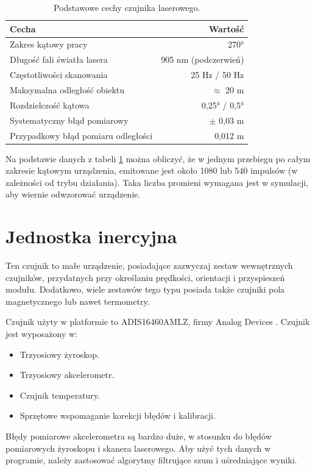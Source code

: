 		\begin{table}
			\centering
			\begin{tabular}{l r}
			Cecha & Wartość \\
			\hline
			Zakres kątowy pracy & \ang{270} \\
			Długość fali światła lasera & 905 \si{\nano\metre} (podczerwień) \\
			Częstotliwości skanowania & 25 \si{\hertz} / 50 \si{\hertz} \\
			Maksymalna odległość obiektu & $\approx$ 20 \si{\metre} \\
			Rozdzielczość kątowa & 0,25° / 0,5° \\
			Systematyczny błąd pomiarowy & $\pm$ 0,03 \si{\metre} \\
			Przypadkowy błąd pomiaru odległości & 0,012 \si{\metre} \\
			\end{tabular}
			\caption{Podstawowe cechy czujnika laserowego.}
			\label{tab:lidar}
		\end{table}
		
		Na podstawie danych z tabeli \ref{tab:lidar} można obliczyć, że w jednym przebiegu po całym zakresie kątowym urządzenia, 
		emitowane jest około 1080 lub 540 impulsów (w zależności od trybu działania).
		Taka liczba promieni wymagana jest w symulacji, aby wiernie odwzorować urządzenie.

\section{Jednostka inercyjna}
	Ten czujnik to małe urządzenie, posiadające zazwyczaj zestaw wewnętrznych czujników, przydatnych przy określaniu prędkości, orientacji i przyspieszeń modułu.
	Dodatkowo, wiele zestawów tego typu posiada także czujniki pola magnetycznego lub nawet termometry.
	
	Czujnik użyty w platformie to ADIS16460AMLZ, firmy Analog Devices \cite{adis_website}.
	Czujnik jest wyposażony w:
	\begin{itemize}
		\item Trzyosiowy żyroskop.
		\item Trzyosiowy akcelerometr.
		\item Czujnik temperatury.
		\item Sprzętowe wspomaganie korekcji błędów i kalibracji.
	\end{itemize}
	
	Błędy pomiarowe akcelerometra są bardzo duże, w stosunku do błędów pomiarowych żyroskopu i skanera laserowego. 
	Aby użyć tych danych w programie, należy zastosować algorytmy filtrujące szum i uśredniające wyniki.
	
